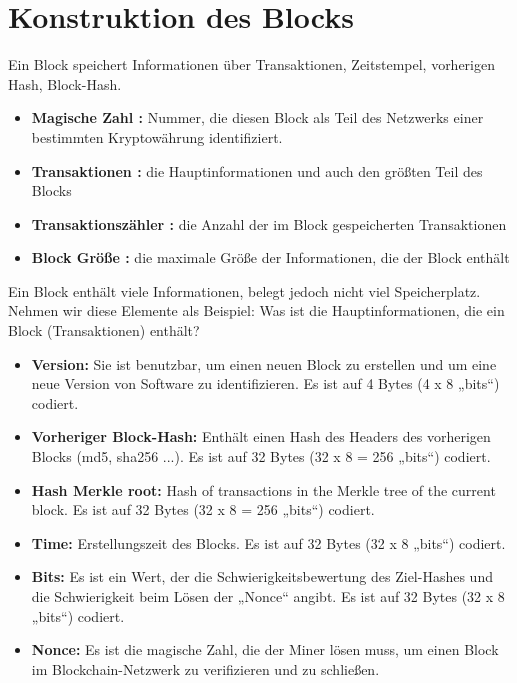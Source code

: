 \documentclass[ngerman]{scrreprt}
\begin{document}
\section{Konstruktion des Blocks}
Ein Block speichert Informationen über Transaktionen, Zeitstempel, vorherigen Hash, Block-Hash.
\begin{itemize}
\item \textbf{Magische Zahl :} Nummer, die diesen Block als Teil des Netzwerks einer bestimmten Kryptowährung identifiziert.
\item \textbf{Transaktionen :} die Hauptinformationen und auch den größten Teil des Blocks
\item \textbf{Transaktionszähler :} die Anzahl der im Block gespeicherten Transaktionen
\item \textbf{Block Größe :} die maximale Größe der Informationen, die der Block enthält
\end{itemize} 
Ein Block enthält viele Informationen, belegt jedoch nicht viel Speicherplatz. Nehmen wir diese Elemente als Beispiel:
Was ist die Hauptinformationen, die ein Block (Transaktionen) enthält?
\begin{itemize}
\item \textbf{Version:} Sie ist benutzbar, um einen neuen Block zu erstellen und um eine neue Version von Software zu identifizieren. Es ist auf 4 Bytes (4 x 8 „bits“) codiert.
\item \textbf{Vorheriger Block-Hash:} Enthält einen Hash des Headers des vorherigen Blocks (md5, sha256 ...). Es ist auf 32 Bytes (32 x 8 = 256 „bits“) codiert.
\item \textbf{Hash Merkle root:} Hash of transactions in the Merkle tree of the current block. Es ist auf 32 Bytes (32 x 8 = 256 „bits“) codiert.
\item \textbf{Time:} Erstellungszeit des Blocks. Es ist auf 32 Bytes (32 x 8 „bits“) codiert.
\item \textbf{Bits:} Es ist ein Wert, der die Schwierigkeitsbewertung des Ziel-Hashes und die Schwierigkeit beim Lösen der „Nonce“ angibt. Es ist auf 32 Bytes (32 x 8 „bits“) codiert.
\item \textbf{Nonce:} Es ist die magische Zahl, die der Miner lösen muss, um einen Block im Blockchain-Netzwerk zu verifizieren und zu schließen.\\ \\ \\ \\ \\
\end{itemize}
\end{document}
